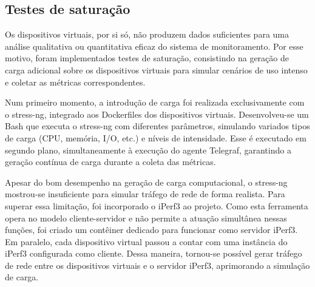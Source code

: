 \subsection{Testes de saturação}
\label{subsection:TestesSaturacao}

Os dispositivos virtuais, por si só, não produzem dados suficientes para uma análise qualitativa ou quantitativa eficaz do sistema de monitoramento. Por esse motivo, foram implementados testes de saturação, consistindo na geração de carga adicional sobre os dispositivos virtuais para simular cenários de uso intenso e coletar as métricas correspondentes.

Num primeiro momento, a introdução de carga foi realizada exclusivamente com o stress-ng, integrado aos Dockerfiles dos dispositivos virtuais. Desenvolveu-se um  Bash que executa o stress-ng com diferentes parâmetros, simulando variados tipos de carga (CPU, memória, I/O, etc.) e níveis de intensidade. Esse  é executado em segundo plano, simultaneamente à execução do agente Telegraf, garantindo a geração contínua de carga durante a coleta das métricas.

Apesar do bom desempenho na geração de carga computacional, o stress-ng mostrou-se insuficiente para simular tráfego de rede de forma realista. Para superar essa limitação, foi incorporado o iPerf3 ao projeto. Como esta ferramenta opera no modelo cliente-servidor e não permite a atuação simultânea nessas funções, foi criado um contêiner dedicado para funcionar como servidor iPerf3. Em paralelo, cada dispositivo virtual passou a contar com uma instância do iPerf3 configurada como cliente. Dessa maneira, tornou-se possível gerar tráfego de rede entre os dispositivos virtuais e o servidor iPerf3, aprimorando a simulação de carga.

